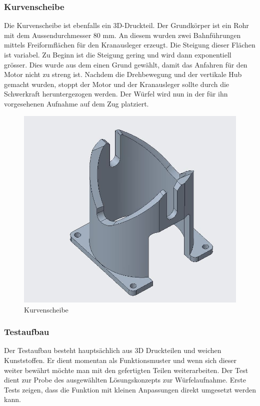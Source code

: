 \documentclass[../../main.tex]{subfiles}
\begin{document}
        \subsubsection{Kurvenscheibe}
        Die Kurvenscheibe ist ebenfalls ein 3D-Druckteil. Der Grundkörper ist ein Rohr mit dem Aussendurchmesser 80 mm. An diesem wurden zwei Bahnführungen mittels Freiformflächen für den Kranausleger erzeugt. Die Steigung dieser Flächen ist variabel. Zu Beginn ist die Steigung gering und wird dann exponentiell grösser. Dies wurde aus dem einen Grund gewählt, damit das Anfahren für den Motor nicht zu streng ist. Nachdem die Drehbewegung und der vertikale Hub gemacht wurden, stoppt der Motor und der Kranausleger sollte durch die Schwerkraft heruntergezogen werden. Der Würfel wird nun in der für ihn vorgesehenen Aufnahme auf dem Zug platziert.


        \begin{figure}[H]
            \centering
            \includegraphics[width=1.0\textwidth]{../../images/Kran/Kurvenscheibe.JPG}
            \caption {Kurvenscheibe}
            \label{fig:et_komponenten}
        \end{figure}




        \subsubsection{Testaufbau}
        Der Testaufbau besteht hauptsächlich aus 3D Druckteilen und weichen Kunststoffen. Er dient momentan als Funktionsmuster und wenn sich dieser weiter bewährt möchte man mit den gefertigten Teilen weiterarbeiten. Der Test dient zur Probe des ausgewählten Lösungskonzepts zur Würfelaufnahme. Erste Tests zeigen, dass die Funktion mit kleinen Anpassungen direkt umgesetzt werden kann.
\end{document}
